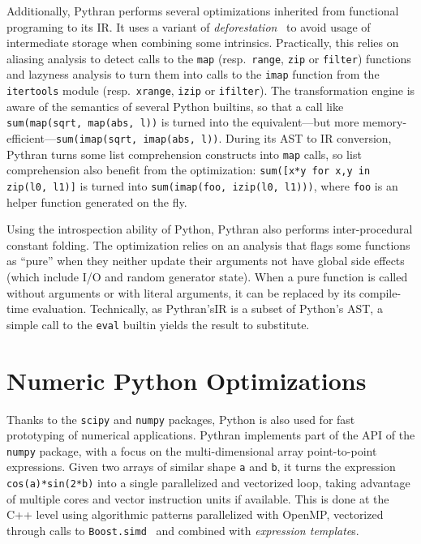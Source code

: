 \documentclass{llncs}
\begin{document}
Additionally, Pythran performs several optimizations inherited from functional
programing to its \ac{IR}. It uses a variant of
\emph{deforestation}~\cite{Wadler1988} to avoid usage of intermediate storage
when combining some intrinsics. Practically, this relies on aliasing analysis
to detect calls to the \texttt{map} (resp.\ \texttt{range}, \texttt{zip} or
\texttt{filter}) functions and lazyness analysis to turn them into calls to the
\texttt{imap} function from the \texttt{itertools} module (resp.\
\texttt{xrange}, \texttt{izip} or \texttt{ifilter}). The transformation engine
is aware of the semantics of several Python builtins, so that a call like
\texttt{sum(map(sqrt, map(abs, l))} is turned into the equivalent---but more
memory-efficient---\texttt{sum(imap(sqrt, imap(abs, l))}. During its \ac{AST}
to \ac{IR} conversion, Pythran turns some list comprehension constructs into
\texttt{map} calls, so list comprehension also benefit from the optimization:
\texttt{sum([x*y for x,y in zip(l0, l1)]} is turned into \texttt{sum(imap(foo,
izip(l0, l1)))}, where \texttt{foo} is an helper function generated on the fly.

Using the introspection ability of Python, Pythran also performs
inter-procedural constant folding. The optimization relies on an analysis that
flags some functions as ``pure'' when they neither update their arguments not
have global side effects (which include I/O and random generator state). When a
pure function is called without arguments or with literal arguments, it can be
replaced by its compile-time evaluation. Technically, as Pythran's\ac{IR} is a
subset of Python's \ac{AST}, a simple call to the \texttt{eval} builtin yields
the result to substitute.

\section{Numeric Python Optimizations}
\label{sec:numeric-optim}

Thanks to the \texttt{scipy} and \texttt{numpy} packages, Python is also used
for fast prototyping of numerical applications. Pythran
implements part of the \acs{API} of the \texttt{numpy} package, with a focus on
the multi-dimensional array point-to-point expressions. Given two arrays of
similar shape \texttt{a} and \texttt{b}, it turns the expression
\texttt{cos(a)*sin(2*b)} into a single parallelized and vectorized loop, taking
advantage of multiple cores and vector instruction units if available. This is
done at the C++ level using algorithmic patterns parallelized with OpenMP,
vectorized through calls to \texttt{Boost.simd}~\cite{boostsimd2012} and
combined with \emph{expression template}s.
\end{document}
